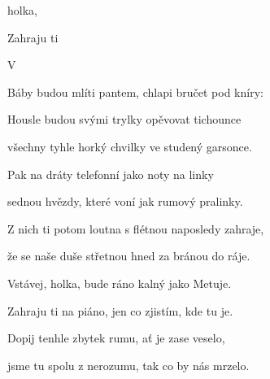 

\zs
{} holka,  

 

Zahraju ti 

  

   

 

V  

 
\ks

\zs
Báby budou mlíti pantem, chlapi bručet pod kníry:


Housle budou svými trylky opěvovat tichounce

všechny tyhle horký chvilky ve studený garsonce.
\ks

\zs
Pak na dráty telefonní jako noty na linky

sednou hvězdy, které voní jak rumový pralinky.

Z nich ti potom loutna s flétnou naposledy zahraje,

že se naše duše střetnou hned za bránou do ráje.
\ks

\zs
Vstávej, holka, bude ráno kalný jako Metuje.

Zahraju ti na piáno, jen co zjistím, kde tu je.

Dopij tenhle zbytek rumu, ať je zase veselo,

jsme tu spolu z nerozumu, tak co by nás mrzelo. 
\ks

\kp
